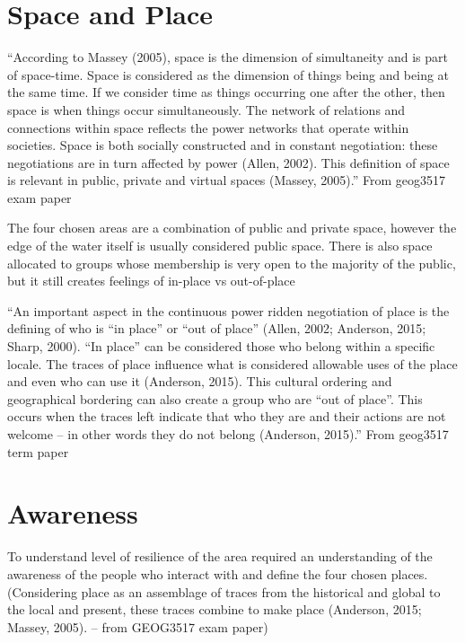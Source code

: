 \documentclass{article}
\begin{document}
\section{Space and Place} 
“According to Massey (2005), space is the dimension of simultaneity and is part of space-time.
Space is considered as the dimension of things being and being at the same time. If we
consider time as things occurring one after the other, then space is when things occur
simultaneously. The network of relations and connections within space reflects the power
networks that operate within societies. Space is both socially constructed and in constant
negotiation: these negotiations are in turn affected by power (Allen, 2002). This definition of
space is relevant in public, private and virtual spaces (Massey, 2005).” From geog3517 exam paper

The four chosen areas are a combination of public and private space, however the edge of the water itself is usually considered public space. There is also space allocated to groups whose membership is very open to the majority of the public, but it still creates feelings of in-place vs out-of-place


“An important aspect in the continuous power ridden negotiation of place is the defining of who is “in place” or “out of place” (Allen, 2002; Anderson, 2015; Sharp, 2000). “In place” can be considered
those who belong within a specific locale. The traces of place influence what is considered
allowable uses of the place and even who can use it (Anderson, 2015). This cultural ordering
and geographical bordering can also create a group who are “out of place”. This occurs when
the traces left indicate that who they are and their actions are not welcome – in other words
they do not belong (Anderson, 2015).” From geog3517 term paper

\section{Awareness}
To understand level of resilience of the area required an understanding of the awareness of the people who interact with and define the four chosen places. (Considering place as an assemblage of traces from the historical and global to the local and present, these traces combine to make place (Anderson, 2015; Massey, 2005). – from GEOG3517 exam paper)
\end{document}
